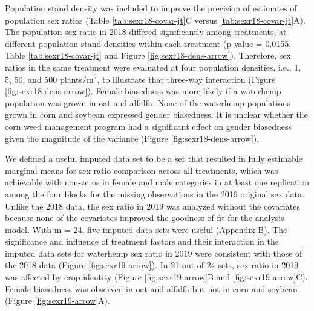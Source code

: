 \documentclass[
]{article}
\begin{document}
Population stand density was included to improve the precision of estimates of population sex ratios (Table \ref{tab:sexr18-covar-jt}C versus \ref{tab:sexr18-covar-jt}A). The population sex ratio in 2018 differed significantly among treatments, at different population stand densities within each treatment (p-value = 0.0155, Table \ref{tab:sexr18-covar-jt} and Figure \ref{fig:sexr18-dens-arrow}). Therefore, sex ratios in the same treatment were evaluated at four population densities, i.e., 1, 5, 50, and 500 plants/m\(^2\), to illustrate that three-way interaction (Figure \ref{fig:sexr18-dens-arrow}). Female-biasedness was more likely if a waterhemp population was grown in oat and alfalfa. None of the waterhemp populations grown in corn and soybean expressed gender biasedness. It is unclear whether the corn weed management program had a significant effect on gender biasedness given the magnitude of the variance (Figure \ref{fig:sexr18-dens-arrow}).

We defined a useful imputed data set to be a set that resulted in fully estimable marginal means for sex ratio comparison across all treatments, which was achievable with non-zeros in female and male categories in at least one replication among the four blocks for the missing observations in the 2019 original sex data. Unlike the 2018 data, the sex ratio in 2019 was analyzed without the covariates because none of the covariates improved the goodness of fit for the analysis model. With m = 24, five imputed data sets were useful (Appendix B). The significance and influence of treatment factors and their interaction in the imputed data sets for waterhemp sex ratio in 2019 were consistent with those of the 2018 data (Figure \ref{fig:sexr19-arrow}). In 21 out of 24 sets, sex ratio in 2019 was affected by crop identity (Figure \ref{fig:sexr19-arrow}B and \ref{fig:sexr19-arrow}C). Female biasedness was observed in oat and alfalfa but not in corn and soybean (Figure \ref{fig:sexr19-arrow}A).
\end{document}
